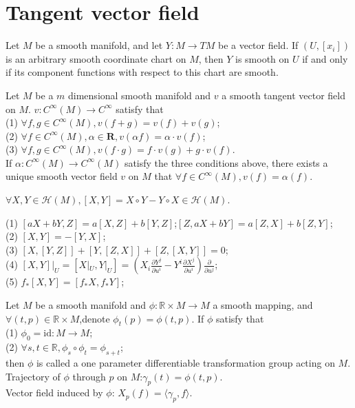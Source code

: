 \section{Tangent vector field}
\begin{newthem}
Let $M$ be a smooth manifold, and let $Y:M \to TM$ be a vector field. If $(U, [x_i])$ is an arbitrary smooth coordinate chart on $M$, then $Y$ is smooth on $U$ if and only if its component functions with respect to this chart are smooth.
\end{newthem}

\begin{newthem}
Let $M$ be a $m$ dimensional smooth manifold and $v$ a smooth tangent vector field on $M$. $v:C^{\infty}(M) \to C^{\infty}$ satisfy that\\
(1) $\forall f,g \in C^{\infty}(M),v(f+g)=v(f)+v(g)$;\\
(2) $\forall f \in C^{\infty}(M),\alpha \in \bm{R},v(\alpha f)=\alpha \cdot v(f)$;\\
(3) $\forall f,g \in C^{\infty}(M),v(f\cdot g) = f \cdot v(g) + g \cdot v(f)$.\\
If $\alpha:C^{\infty}(M) \to C^{\infty}(M)$ satisfy the three conditions above, there exists a unique smooth vector field $v$ on $M$ that $\forall f \in C^{\infty}(M),v(f)=\alpha(f)$.
\end{newthem}

\begin{newthem}
$\forall X,Y \in \mathcal{H}(M),[X,Y]=X \circ Y -Y \circ X \in \mathcal{H}(M)$.
\end{newthem}

\begin{newprop}
(1) $[aX+bY,Z]=a[X,Z]+b[Y,Z]$;$[Z,aX+bY]=a[Z,X]+b[Z,Y]$;\\
(2) $[X,Y]=-[Y,X]$;\\
(3) $[X,[Y,Z]] + [Y,[Z,X]] +[Z,[X,Y]]=0$;\\
(4) $[X,Y]|_{U} = [X|_{U},Y|_{U}] = (X_i \frac{\partial Y^j}{\partial u^i} - Y^i \frac{\partial X^j}{\partial u^i}) \frac{\partial}{\partial u^j}$;\\
(5) $f_{*}[X,Y] = [f_{*}X,f_{*}Y]$;
\end{newprop}

\begin{newdef}
Let $M$ be a smooth manifold and $\phi:\mathbb{R} \times M \to M$ a smooth mapping, and $\forall (t,p) \in \mathbb{R} \times M$,denote $\phi_{t}(p) = \phi(t,p)$. If $\phi$ satisfy that\\
(1) $\phi_0 = \mathrm{id}:M \to M$;\\
(2) $\forall s,t \in \mathbb{R}, \phi_s \circ \phi_t = \phi_{s+t}$;\\
then $\phi$ is called a one parameter differentiable transformation group acting on $M$.\\
Trajectory of $\phi$ through $p$ on $M$:$\gamma_p(t) = \phi(t,p)$.\\
Vector field induced by $\phi$: $X_p(f) = \langle \gamma_p , f \rangle$.
\end{newdef}

